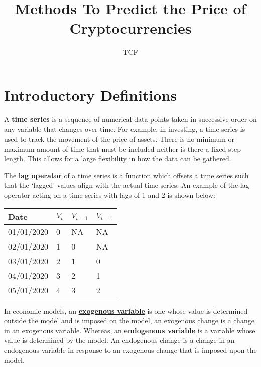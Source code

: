 \documentclass[11pt]{article}
\title{\vspace{6cm} \textbf{Methods To Predict the Price of Cryptocurrencies}}
\date{}
\author{TCF}
\begin{document}
\maketitle
\pagebreak

\section{Introductory Definitions}

A \href{https://www.investopedia.com/terms/t/timeseries.asp}{\textbf{time series}} is a sequence of numerical data points taken in successive order on any variable that changes over time. For example, in investing, a time series is used to track the movement of the price of assets. There is no minimum or maximum amount of time that must be included neither is there a fixed step length. This allows for a large flexibility in how the data can be gathered.

The \href{https://www.business-science.io/timeseries-analysis/2017/08/30/tidy-timeseries-analysis-pt-4.html}{\textbf{lag operator}} of a time series is a function which offsets a time series such that the `lagged' values align with the actual time series. An example of the lag operator acting on a time series with lags of 1 and 2 is shown below: 
\begin{table}[h]
	\centering
	\begin{tabular}{ |p{2cm}||p{2cm}|p{2cm}|p{2cm}| }
	\hline
	Date & $V_t$ & $V_{t-1}$ & $V_{t-1}$ \\
	\hline
	01/01/2020 & 0 & NA & NA \\
	\hline
	02/01/2020 & 1 & 0 & NA \\
	\hline
	03/01/2020 & 2 & 1 & 0 \\
	\hline
	04/01/2020 & 3 & 2 & 1 \\
	\hline
	05/01/2020 & 4 & 3 & 2 \\
	\hline
	\end{tabular}
\end{table}

In economic models, an \href{https://en.wikipedia.org/wiki/Exogenous_and_endogenous_variables}{\textbf{exogenous variable}} is one whose value is determined outside the model and is imposed on the model, an exogenous change is a change in an exogenous variable. Whereas, an \href{https://en.wikipedia.org/wiki/Exogenous_and_endogenous_variables}{\textbf{endogenous variable}} is a variable whose value is determined by the model. An endogenous change is a change in an endogenous variable in response to an exogenous change that is imposed upon the model. 
\end{document}
